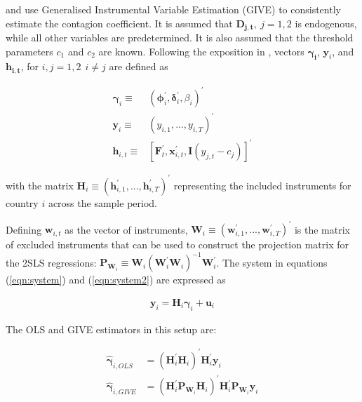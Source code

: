 \documentclass[../base.tex]{subfiles}
\begin{document}
\cite{pesaran2007econometric} and \cite{metiu2012sovereign} use Generalised Instrumental Variable Estimation (GIVE) to consistently estimate the contagion coefficient. It is assumed that $\mathbf{D_{j,t}},~ j = 1, 2$ is endogenous, while all other variables are predetermined. It is also assumed that the threshold parameters $c_1$ and $c_2$ are known. Following the exposition in \cite{massacci2007identification}, vectors $\mathbf{\gamma_i}$, $\mathbf{y}_i$, and $\mathbf{h_{i,t}}$, for $i,j = 1,2 ~~ i \neq j$ are defined as 

\begin{align*}
 \mathbf{\gamma}_i \equiv& (\mathbf{\phi}_i^{\prime}, \mathbf{\delta}_{i}^{\prime}, \beta_i)^{\prime} \\
 \mathbf{y}_i \equiv& (y_{i,1},...,y_{i,T})^{\prime}\\
 \mathbf{h}_{i,t} \equiv& [\mathbf{F}_t^{\prime}, \mathbf{x}_{i,t}^{\prime}, \mathbf{I}(y_{j,t} - c_j)]^{\prime}
\end{align*}

with the matrix $\mathbf{H}_i \equiv (\mathbf{h}_{i,1}^{\prime},..., \mathbf{h}_{i,T}^{\prime})^{\prime}$ representing the included instruments for country $i$ across the sample period. 

Defining $\mathbf{w}_{i,t}$ as the vector of instruments, $\mathbf{W}_i \equiv (\mathbf{w}_{i,1}^{\prime},..., \mathbf{w}_{i,T}^{\prime})^{\prime}$ is the matrix of excluded instruments that can be used to construct the projection matrix for the 2SLS regressions: $\mathbf{P}_{\mathbf{W}_i} \equiv \mathbf{W}_i (\mathbf{W}_i^{\prime} \mathbf{W}_i)^{-1} \mathbf{W}_i^{\prime}$. The system in equations (\ref{eqn:system}) and (\ref{eqn:system2}) are expressed as

\begin{align}
	\mathbf{y}_i = \mathbf{H}_i \mathbf{\gamma}_i + \mathbf{u}_i \label{eqn:matrix_system}
\end{align}

The OLS and GIVE estimators in this setup are:

\begin{align}
	\hat{\mathbf{\gamma}}_{i, OLS} &= (\mathbf{H}_i^{\prime} \mathbf{H}_i)^{\prime} \mathbf{H}_i^{\prime} \mathbf{y}_i	\label{eqn:ols}\\	
	\hat{\mathbf{\gamma}}_{i, GIVE} &= (\mathbf{H}_i^{\prime} \mathbf{P}_{\mathbf{W}_i} \mathbf{H}_i)^{\prime} \mathbf{H}_i^{\prime} \mathbf{P}_{\mathbf{W}_i} \mathbf{y}_i \label{eqn:give}	
\end{align}
\end{document}
